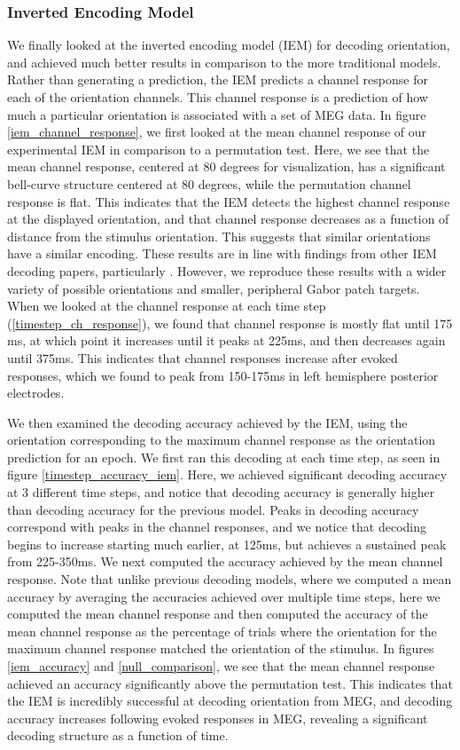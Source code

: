 \documentclass[../main.tex]{subfiles}
\begin{document}
\subsubsection{Inverted Encoding Model}
We finally looked at the inverted encoding model (IEM) for decoding orientation, and achieved much better results in comparison to the more traditional models. Rather than generating a prediction, the IEM predicts a channel response for each of the orientation channels. This channel response is a prediction of how much a particular orientation is associated with a set of MEG data. In figure \ref{iem_channel_response}, we first looked at the mean channel response of our experimental IEM in comparison to a permutation test. Here, we see that the mean channel response, centered at 80 degrees for visualization, has a significant bell-curve structure centered at 80 degrees, while the permutation channel response is flat. This indicates that the IEM detects the highest channel response at the displayed orientation, and that channel response decreases as a function of distance from the stimulus orientation. This suggests that similar orientations have a similar encoding. These results are in line with findings from other IEM decoding papers, particularly \cite{GARCIA2013515}. However, we reproduce these results with a wider variety of possible orientations and smaller, peripheral Gabor patch targets. When we looked at the channel response at each time step (\ref{timestep_ch_response}), we found that channel response is mostly flat until 175 ms, at which point it increases until it peaks at 225ms, and then decreases again until 375ms. This indicates that channel responses increase after evoked responses, which we found to peak from 150-175ms in left hemisphere posterior electrodes.

We then examined the decoding accuracy achieved by the IEM, using the orientation corresponding to the maximum channel response as the orientation prediction for an epoch. We first ran this decoding at each time step, as seen in figure \ref{timestep_accuracy_iem}. Here, we achieved significant decoding accuracy at 3 different time steps, and notice that decoding accuracy is generally higher than decoding accuracy for the previous model. Peaks in decoding accuracy correspond with peaks in the channel responses, and we notice that decoding begins to increase starting much earlier, at 125ms, but achieves a sustained peak from 225-350ms. We next computed the accuracy achieved by the mean channel response. Note that unlike previous decoding models, where we computed a mean accuracy by averaging the accuracies achieved over multiple time steps, here we computed the mean channel response and then computed the accuracy of the mean channel response as the percentage of trials where the orientation for the maximum channel response matched the orientation of the stimulus. In figures \ref{iem_accuracy} and \ref{null_comparison}, we see that the mean channel response achieved an accuracy significantly above the permutation test. This indicates that the IEM is incredibly successful at decoding orientation from MEG, and decoding accuracy increases following evoked responses in MEG, revealing a significant decoding structure as a function of time.
\end{document}

